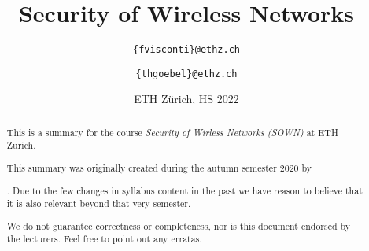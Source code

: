 \documentclass[paper=a4, parskip=half-]{scrartcl}
\title{Security of Wireless Networks}
\author{\texttt{\{fvisconti\}@ethz.ch}}
\date{ETH Zürich, HS 2022}
\begin{document}
\begin{titlepage}
\maketitle

\vspace{5cm}
\thispagestyle{empty}


\begin{abstract}
This is a summary for the course \textit{Security of Wirless Networks (SOWN)} at ETH Zurich.

This summary was originally created during the autumn semester 2020 by \author{\texttt{\{thgoebel\}@ethz.ch}}.
Due to the few changes in syllabus content in the past we have reason to believe that it is also relevant beyond that very semester.

We do not guarantee correctness or completeness, nor is this document endorsed by the lecturers.
Feel free to point out any erratas.
\end{abstract}

\end{titlepage}

\tableofcontents
\newpage



\newpage


\newpage


\newpage


\newpage


\newpage


\newpage


\newpage


\newpage


\newpage


\newpage


\newpage


\end{document}
